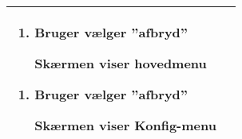 \begin{center}
\begin{longtable}{|p{5cm}|p{9cm}|}
\begin{enumerate}[label=\ref{uc2afbryd}.a]
				\item Bruger vælger ''afbryd''
				
					\subitem Skærmen viser hovedmenu
			\end{enumerate}
			
			\begin{enumerate}[label=\ref{uc2afbryd2}.a]
				
				\item Bruger vælger ''afbryd''
				
				\subitem Skærmen viser Konfig-menu

			\end{enumerate}														\\\hline
	\end{longtable}
\end{center}

